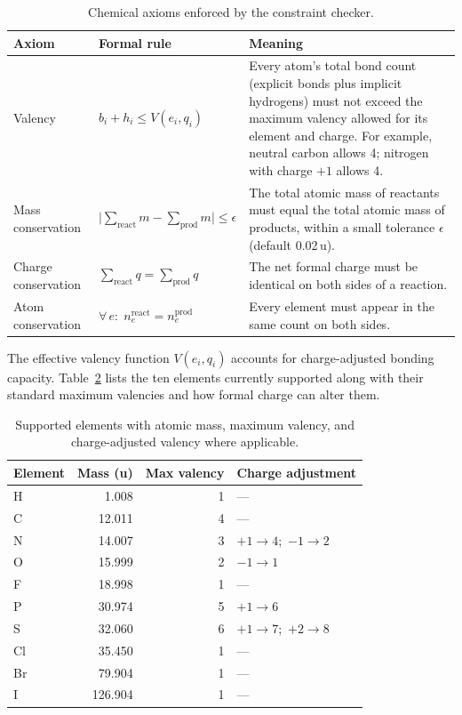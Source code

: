 \documentclass[11pt]{article}
\begin{document}
\begin{table}[H]
\centering
\caption{Chemical axioms enforced by the constraint checker.}
\label{tab:axioms}
\begin{tabular}{@{}llp{6.5cm}@{}}
\toprule
Axiom & Formal rule & Meaning \\
\midrule
Valency &
  $b_i + h_i \leq V(e_i, q_i)$ &
  Every atom's total bond count (explicit bonds plus implicit hydrogens)
  must not exceed the maximum valency allowed for its element and charge.
  For example, neutral carbon allows 4; nitrogen with charge $+1$ allows 4. \\[4pt]
Mass conservation &
  $\bigl|\sum_{\text{react}} m - \sum_{\text{prod}} m\bigr| \leq \epsilon$ &
  The total atomic mass of reactants must equal the total atomic mass
  of products, within a small tolerance $\epsilon$ (default 0.02\,u). \\[4pt]
Charge conservation &
  $\sum_{\text{react}} q = \sum_{\text{prod}} q$ &
  The net formal charge must be identical on both sides of a reaction. \\[4pt]
Atom conservation &
  $\forall\, e:\; n_e^{\text{react}} = n_e^{\text{prod}}$ &
  Every element must appear in the same count on both sides. \\
\bottomrule
\end{tabular}
\end{table}

The effective valency function $V(e_i, q_i)$ accounts for
charge-adjusted bonding capacity. Table~\ref{tab:elements} lists the
ten elements currently supported along with their standard maximum
valencies and how formal charge can alter them.

\begin{table}[H]
\centering
\caption{Supported elements with atomic mass, maximum valency, and
         charge-adjusted valency where applicable.}
\label{tab:elements}
\begin{tabular}{@{}lrrl@{}}
\toprule
Element & Mass (u) & Max valency & Charge adjustment \\
\midrule
H  &   1.008 & 1 & --- \\
C  &  12.011 & 4 & --- \\
N  &  14.007 & 3 & $+1 \to 4$;\ $-1 \to 2$ \\
O  &  15.999 & 2 & $-1 \to 1$ \\
F  &  18.998 & 1 & --- \\
P  &  30.974 & 5 & $+1 \to 6$ \\
S  &  32.060 & 6 & $+1 \to 7$;\ $+2 \to 8$ \\
Cl &  35.450 & 1 & --- \\
Br &  79.904 & 1 & --- \\
I  & 126.904 & 1 & --- \\
\bottomrule
\end{tabular}
\end{table}
\end{document}
